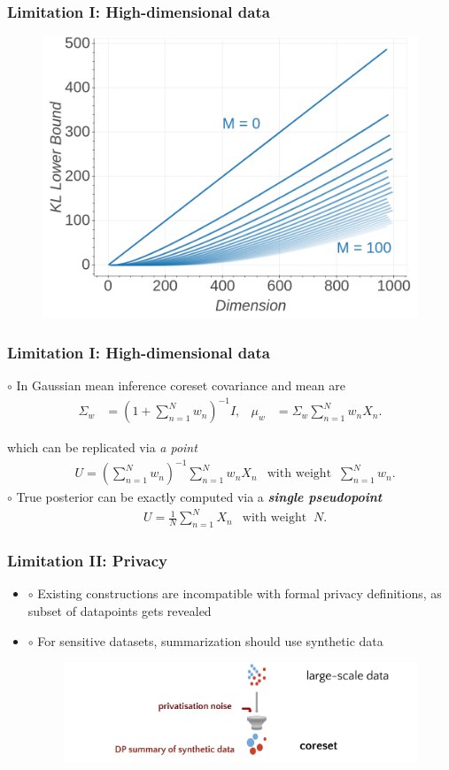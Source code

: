 \documentclass[hyperref={colorlinks = true},unknownkeysallowed]{beamer}
\newenvironment{figure*}%
{\begin{figure}}
	{\end{figure}}
\begin{document}
\begin{frame}
	\frametitle{Limitation I: High-dimensional data}
			\centering
	\begin{figure}
		\includegraphics[width=.8\linewidth]{figs/klbound.png}
	\end{figure}
\end{frame}

\begin{frame}
	\frametitle{Limitation I: High-dimensional data}
	$\circ$ In Gaussian mean inference coreset covariance and mean are 
	\begin{align*}
	\Sigma_w &=\left(1+\sum_{n=1}^N w_n\right)^{-1} I, & \mu_w &= \Sigma_w \sum_{n=1}^N w_n X_n.\label{eq:gausswpost}
	\end{align*}
	
	which can be replicated via \emph{a point}
	\begin{align*}
	& U = \left(\sum_{n=1}^Nw_n\right)^{-1}\sum_{n=1}^N w_nX_n
	& \text{with weight}\;\; \sum_{n=1}^N w_n.
	\end{align*}
	$\circ$ True posterior can be exactly computed via a \textbf{\emph{single pseudopoint}}
	\begin{align*}
	& U = \frac{1}{N}\sum_{n=1}^N X_n & \text{with weight}\;\; N.
	\end{align*}
\end{frame}

\begin{frame}
	\frametitle{Limitation II: Privacy}
	\begin{itemize}
		\item $\circ$	Existing constructions are incompatible with formal privacy definitions, as subset
		of datapoints gets revealed 
		\item $\circ$	For sensitive datasets, summarization
		should use synthetic data
		\begin{figure}
			\includegraphics[width=1\linewidth]{figs/dp_summarize.png}
		\end{figure}
	\end{itemize}
\end{frame}
\end{document}
